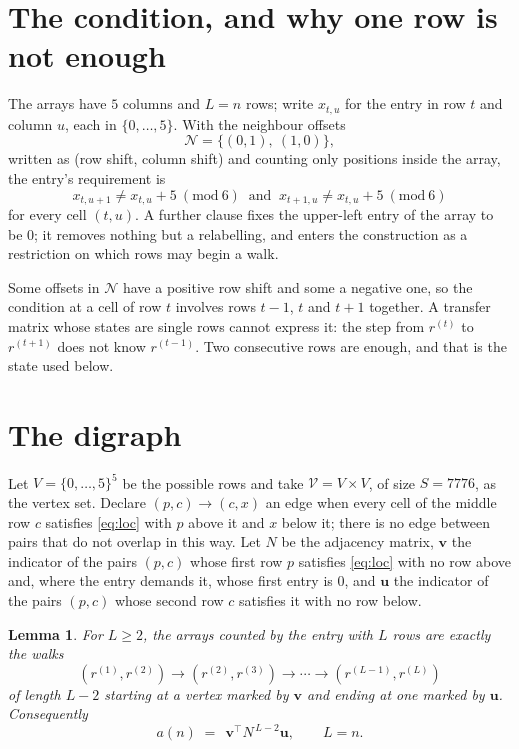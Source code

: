 \documentclass[11pt,a4paper]{article}
\theoremstyle{plain}
\newtheorem{lemma}[theorem]{Lemma}
\theoremstyle{definition}
\begin{document}
\section{The condition, and why one row is not enough}

The arrays have $5$ columns and $L=n$ rows; write $x_{t,u}$ for the entry in
row $t$ and column $u$, each in $\{0,\dots,5\}$. With the neighbour offsets
\[
\mathcal N=\{(0,1),\ (1,0)\},
\]
written as (row shift, column shift) and counting only positions inside the array, the
entry's requirement is
\begin{equation}\label{eq:loc}
x_{t,u+1}\ne x_{t,u}+5\ (\mathrm{mod}\ 6)\ \text{ and }\ x_{t+1,u}\ne x_{t,u}+5\ (\mathrm{mod}\ 6)
\end{equation}
for every cell $(t,u)$. A further clause fixes the upper-left entry of the array to be $0$; it removes nothing but a relabelling, and enters the construction as a restriction on which rows may begin a walk.

Some offsets in $\mathcal N$ have a positive row shift and some a negative one, so the
condition at a cell of row $t$ involves rows $t-1$, $t$ and $t+1$ together. A transfer
matrix whose states are single rows cannot express it: the step from $r^{(t)}$ to
$r^{(t+1)}$ does not know $r^{(t-1)}$. Two consecutive rows are enough, and that is
the state used below.

\section{The digraph}

Let $V=\{0,\dots,5\}^{5}$ be the possible rows and take
$\mathcal V=V\times V$, of size $S=7776$, as the vertex set. Declare $(p,c)\to(c,x)$ an edge
when every cell of the middle row $c$ satisfies \eqref{eq:loc} with $p$ above it and $x$
below it; there is no edge between pairs that do not overlap in this way. Let $N$ be the
adjacency matrix, $\mathbf{v}$ the indicator of the pairs $(p,c)$ whose first row $p$
satisfies \eqref{eq:loc} with no row above and, where the entry demands it, whose first entry is $0$, and $\mathbf{u}$ the indicator of
the pairs $(p,c)$ whose second row $c$ satisfies it with no row below.

\begin{lemma}\label{lem:walk}
For $L\ge2$, the arrays counted by the entry with $L$ rows are exactly the walks
\[
(r^{(1)},r^{(2)})\to(r^{(2)},r^{(3)})\to\cdots\to(r^{(L-1)},r^{(L)})
\]
of length $L-2$ starting at a vertex marked by $\mathbf{v}$ and ending at one marked by
$\mathbf{u}$. Consequently
\[
a(n)\;=\;\,\mathbf{v}^{\!\top}N^{\,L-2}\mathbf{u},\qquad L=n .
\]
\end{lemma}
\end{document}
